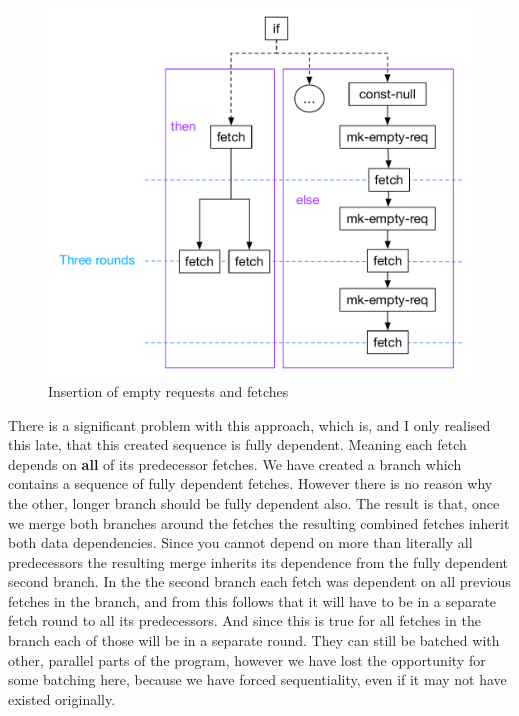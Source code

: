 \begin{figure}
    \includegraphics[width=\linewidth]{../Figures/if-insert-empty-parallel-after-insert}
    \caption{Insertion of empty requests and fetches}
    \label{fig:if-insert-empty-parallel-after}
\end{figure}

There is a significant problem with this approach, which is, and I only realised this late, that this created sequence is fully dependent.
Meaning each fetch depends on \textbf{all} of its predecessor fetches.
We have created a branch which contains a sequence of fully dependent fetches.
However there is no reason why the other, longer branch should be fully dependent also.
The result is that, once we merge both branches around the fetches the resulting combined fetches inherit both data dependencies.
Since you cannot depend on more than literally all predecessors the resulting merge inherits its dependence from the fully dependent second branch.
In the the second branch each fetch was dependent on all previous fetches in the branch, and from this follows that it will have to be in a separate fetch round to all its predecessors.
And since this is true for all fetches in the branch each of those will be in a separate round.
They can still be batched with other, parallel parts of the program, however we have lost the opportunity for some batching here, because we have forced sequentiality, even if it may not have existed originally.


